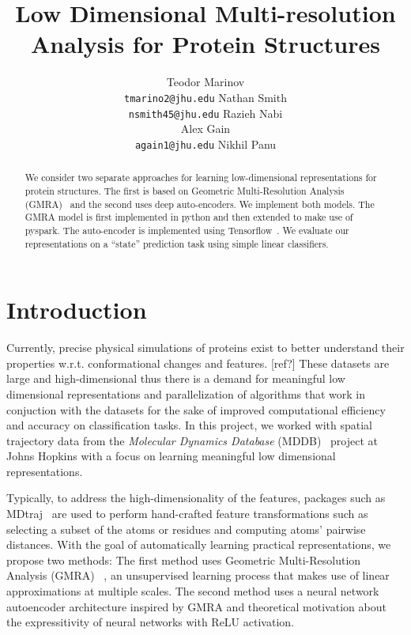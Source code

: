 \documentclass{article}
\title{Low Dimensional Multi-resolution Analysis for Protein Structures}
\author{
  Teodor Marinov\\
  \texttt{tmarino2@jhu.edu} \And
  Nathan Smith\\
  \texttt{nsmith45@jhu.edu} \And
  Razieh Nabi\\
  \texttt{} \And
  Alex Gain\\
  \texttt{again1@jhu.edu} \And
  Nikhil Panu\\
  \texttt{}
}
\begin{document}

\maketitle

\begin{abstract}
  We consider two separate approaches for learning low-dimensional representations for protein structures. The first is based on Geometric Multi-Resolution Analysis (GMRA)~\cite{allard2012multi} and the second uses deep auto-encoders. We implement both models. The GMRA model is first implemented in python and then extended to make use of pyspark. The auto-encoder is implemented using Tensorflow~\cite{abadi2016tensorflow}. We evaluate our representations on a ``state'' prediction task using simple linear classifiers.
\end{abstract}

\section{Introduction}
{\color{red}{TODO:Someone please write a good introduction to our project}}

Currently, precise physical simulations of proteins exist to better understand their properties w.r.t. conformational changes and features. [ref?] These datasets are large and high-dimensional thus there is a demand for meaningful low dimensional representations and parallelization of algorithms that work in conjuction with the datasets for the sake of improved computational efficiency and accuracy on classification tasks. In this project, we worked with spatial trajectory data from the \textit{Molecular Dynamics Database} (MDDB)~\cite{Nutanong:2013:AEL:2484838.2484872} project at Johns Hopkins with a focus on learning meaningful low dimensional representations.

Typically, to address the high-dimensionality of the features, packages such as MDtraj~\cite{McGibbon2015MDTraj} are used to perform hand-crafted feature transformations such as selecting a subset of the atoms or residues and computing atoms' pairwise distances. With the goal of automatically learning practical representations, we propose two methods: The first method uses Geometric Multi-Resolution Analysis (GMRA) ~\cite{allard2012multi}, an unsupervised learning process that makes use of linear approximations at multiple scales. The second method uses a neural network autoencoder architecture inspired by GMRA and theoretical motivation about the expressitivity of neural networks with ReLU activation.
\end{document}
